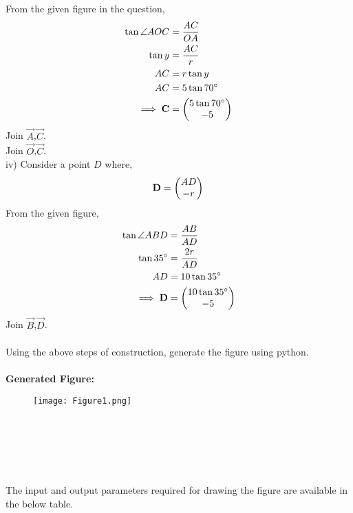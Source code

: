 \documentclass[journal,12pt,twocolumn]{IEEEtran}
\begin{document}
From the given figure in the question,
\begin{align}
\tan \angle AOC&=\frac{AC}{OA}\\
\tan y&=\frac{AC}{r}\\
AC&=r\tan y\\
AC&=5\tan 70^\circ\\
\implies \mathbf C&=\begin{pmatrix}5\tan 70^\circ\\-5\end{pmatrix}
\end{align}
Join $\vec A$,$\vec C$.\\
Join $\vec O$,$\vec C$.\\
iv) 
Consider a point $D$ where,\\
\begin{equation}
\mathbf D=\begin{pmatrix}AD\\-r\end{pmatrix}\\
\end{equation}
From the given figure,
\begin{align}
\tan \angle ABD&=\frac{AB}{AD}\\
\tan 35^\circ&=\frac{2r}{AD}\\
AD&=10\tan 35^\circ \\
\implies \mathbf D &=\begin{pmatrix}10\tan35^\circ\\-5\end{pmatrix}
\end{align}
Join $\vec B$,$\vec D$.\\\\
Using the above steps of construction, generate the figure using python.\\\\
\textbf{Generated Figure:}
\begin{figure}[h]
    \centering
    \texttt{[image: Figure1.png]}
\end{figure}
\\\\\\\\\\
The input and output parameters required for drawing the figure are available in the below table.\\
\end{document}
